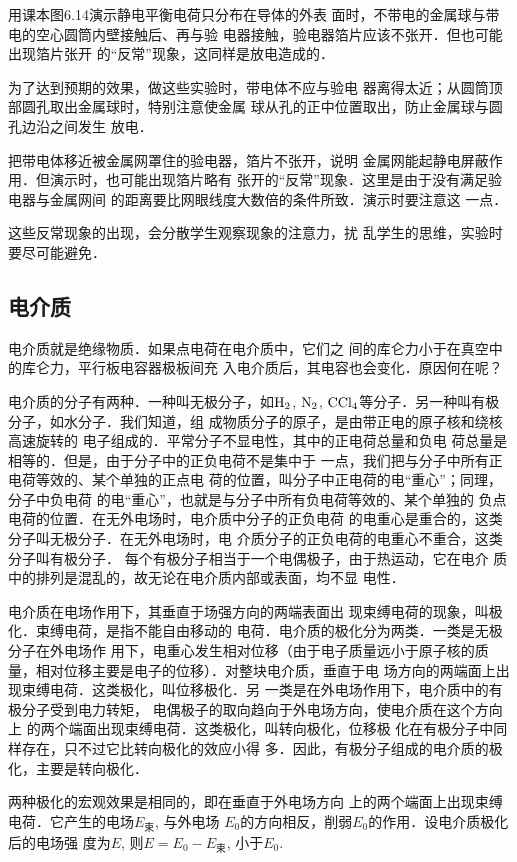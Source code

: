 用课本图6.14演示静电平衡电荷只分布在导体的外表
面时，不带电的金属球与带电的空心圆筒内壁接触后、再与验
电器接触，验电器箔片应该不张开．但也可能出现箔片张开
的“反常”现象，这同样是放电造成的．

为了达到预期的效果，做这些实验时，带电体不应与验电
器离得太近；从圆筒顶部圆孔取出金属球时，特别注意使金属
球从孔的正中位置取出，防止金属球与圆孔边沿之间发生
放电．

把带电体移近被金属网罩住的验电器，箔片不张开，说明
金属网能起静电屏蔽作用．但演示时，也可能出现箔片略有
张开的“反常”现象．这里是由于没有满足验电器与金属网间
的距离要比网眼线度大数倍的条件所致．演示时要注意这
一点．

这些反常现象的出现，会分散学生观察现象的注意力，扰
乱学生的思维，实验时要尽可能避免．

\subsection{电介质}
电介质就是绝缘物质．如果点电荷在电介质中，它们之
间的库仑力小于在真空中的库仑力，平行板电容器极板间充
入电介质后，其电容也会变化．原因何在呢？

电介质的分子有两种．一种叫无极分子，如$\rm H_2$, $\rm N_2$,
$\rm CCl_4$等分子．另一种叫有极分子，如水分子．我们知道，组
成物质分子的原子，是由带正电的原子核和绕核高速旋转的
电子组成的．平常分子不显电性，其中的正电荷总量和负电
荷总量是相等的．但是，由于分子中的正负电荷不是集中于
一点，我们把与分子中所有正电荷等效的、某个单独的正点电
荷的位置，叫分子中正电荷的电“重心”；同理，分子中负电荷
的电“重心”，也就是与分子中所有负电荷等效的、某个单独的
负点电荷的位置．在无外电场时，电介质中分子的正负电荷
的电重心是重合的，这类分子叫无极分子．在无外电场时，电
介质分子的正负电荷的电重心不重合，这类分子叫有极分子．
每个有极分子相当于一个电偶极子，由于热运动，它在电介
质中的排列是混乱的，故无论在电介质内部或表面，均不显
电性．

电介质在电场作用下，其垂直于场强方向的两端表面出
现束缚电荷的现象，叫极化．束缚电荷，是指不能自由移动的
电荷．电介质的极化分为两类．一类是无极分子在外电场作
用下，电重心发生相对位移（由于电子质量远小于原子核的质
量，相对位移主要是电子的位移）．对整块电介质，垂直于电
场方向的两端面上出现束缚电荷．这类极化，叫位移极化．另
一类是在外电场作用下，电介质中的有极分子受到电力转矩，
电偶极子的取向趋向于外电场方向，使电介质在这个方向上
的两个端面出现束缚电荷．这类极化，叫转向极化，位移极
化在有极分子中同样存在，只不过它比转向极化的效应小得
多．因此，有极分子组成的电介质的极化，主要是转向极化．

两种极化的宏观效果是相同的，即在垂直于外电场方向
上的两个端面上出现束缚电荷．它产生的电场$E_{\text{束}}$, 与外电场
$E_0$的方向相反，削弱$E_0$的作用．设电介质极化后的电场强
度为$E$, 则$E=E_0-E_{\text{束}}$, 小于$E_0$.


